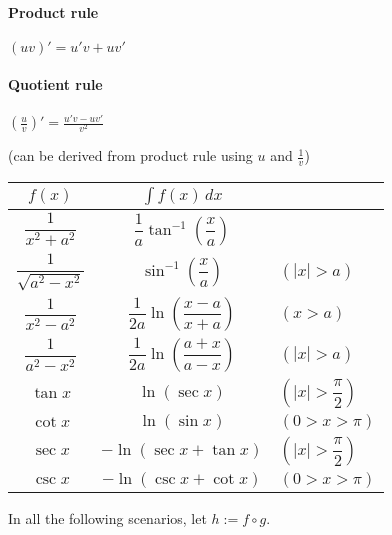 \label{e0367fa}

\paragraph{Product rule} $(uv)'=u'v+uv'$


\paragraph{Quotient rule} $\displaystyle\left(\frac
uv\right)'=\frac{u'v-uv'}{v^2}$

(can be derived from product rule using $u$ and $\frac1v$)

\label{dbd3301}
\begin{center}
  \renewcommand{\arraystretch}{2.1}\def\d{\displaystyle}
  \begin{tabular}{c|c l}
    $f(x)$                    & $\int f(x)\,dx$                               &                    \\\hline
    $\dfrac1{x^2+a^2}$        & $\dfrac1a\tan^{-1}\left(\dfrac xa\right)$     &                    \\
    $\dfrac1{\sqrt{a^2-x^2}}$ & $\sin^{-1}\left(\dfrac xa\right)$             & $(|x|>a)$          \\
    $\dfrac1{x^2-a^2}$        & $\dfrac1{2a}\ln\left(\dfrac{x-a}{x+a}\right)$ & $(x>a)$            \\
    $\dfrac1{a^2-x^2}$        & $\dfrac1{2a}\ln\left(\dfrac{a+x}{a-x}\right)$ & $(|x|>a)$          \\
    $\tan x$                  & $\ln(\sec x)$                                 & $(|x|>\dfrac\pi2)$ \\
    $\cot x$                  & $\ln(\sin x)$                                 & $(0>x>\pi)$        \\
    $\sec x$                  & $-\ln(\sec x+\tan x)$                         & $(|x|>\dfrac\pi2)$ \\
    $\csc x$                  & $-\ln(\csc x+\cot x)$                         & $(0>x>\pi)$
  \end{tabular}
\end{center}

\label{d969d46}

In all the following scenarios, let $h:=f\circ g$.

